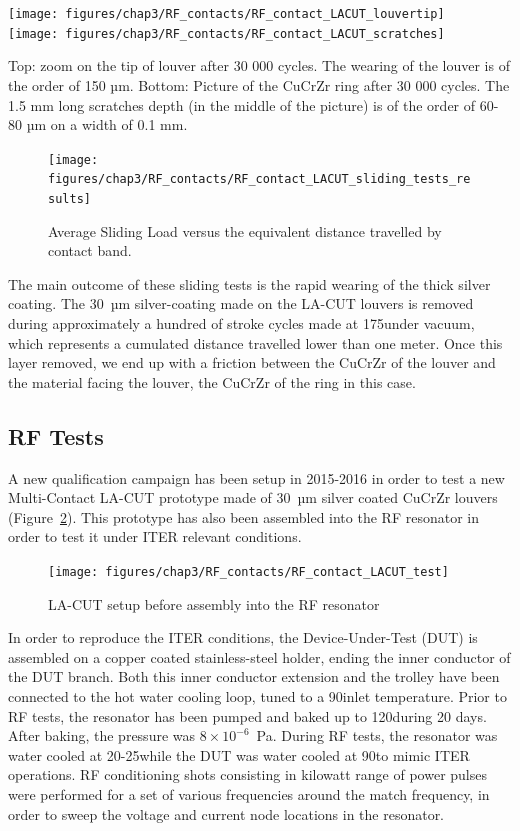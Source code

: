 {\begin{marginfigure}[-4cm]
	\centering
	\texttt{[image: figures/chap3/RF\_contacts/RF\_contact\_LACUT\_louvertip]}\\
	\texttt{[image: figures/chap3/RF\_contacts/RF\_contact\_LACUT\_scratches]}
	\caption{Top: zoom on the tip of louver after 30 000 cycles. The wearing of the louver is of the order of 150 µm. Bottom: Picture of the CuCrZr ring after 30 000 cycles. The 1.5 mm long scratches depth (in the middle of the picture) is of the order of 60-80 µm on a width of 0.1 mm.}
	\label{fig:rfcontactlacutlouvertip}
\end{marginfigure}


\begin{figure}[h]
	\centering
	\texttt{[image: figures/chap3/RF\_contacts/RF\_contact\_LACUT\_sliding\_tests\_results]}
	\caption{Average Sliding Load versus the equivalent distance travelled by contact band.}
	\label{fig:rfcontactlacutslidingtestsresults}
\end{figure}

The main outcome of these sliding tests is the rapid wearing of the thick silver coating. The 30~µm silver-coating made on the LA-CUT louvers is removed during approximately a hundred of stroke cycles made at 175\degC under vacuum, which represents a cumulated distance travelled lower than one meter. Once this layer removed, we end up with a friction between the CuCrZr of the louver and the material facing the louver, the CuCrZr of the ring in this case. 

\subsection{RF Tests}
A new qualification campaign has been setup in 2015-2016 in order to test a new Multi-Contact LA-CUT prototype made of 30~µm silver coated CuCrZr louvers (Figure~\ref{fig:rfcontactlacuttest}). This prototype has also been assembled into the RF resonator in order to test it under ITER relevant conditions. 

\begin{figure}[h]
	\centering
	\texttt{[image: figures/chap3/RF\_contacts/RF\_contact\_LACUT\_test]}
	\caption{LA-CUT setup before assembly into the RF resonator}
	\label{fig:rfcontactlacuttest}
\end{figure}

In order to reproduce the ITER conditions, the Device-Under-Test (DUT) is assembled on a copper coated stainless-steel holder, ending the inner conductor of the DUT branch. Both this inner conductor extension and the trolley have been connected to the hot water cooling loop, tuned to a 90\degC inlet temperature. Prior to RF tests, the resonator has been pumped and baked up to 120\degC during 20 days. After baking, the pressure was $8\times10^{-6}$~Pa. During RF tests, the resonator was water cooled at 20-25\degC while the DUT was water cooled at 90\degC to mimic ITER operations. RF conditioning shots consisting in kilowatt range of power pulses were performed for a set of various frequencies around the match frequency, in order to sweep the voltage and current node locations in the resonator. 

}
